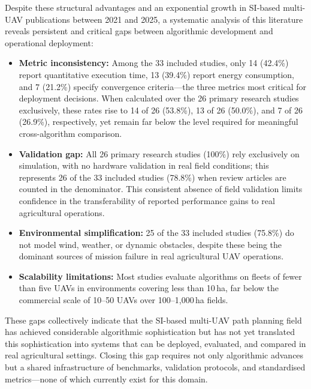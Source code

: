 \documentclass[review,3p,times]{elsarticle}
\begin{document}
Despite these structural advantages and an exponential growth in SI-based multi-UAV publications between 2021 and 2025, a systematic analysis of this literature reveals persistent and critical gaps between algorithmic development and operational deployment:

\begin{itemize}
  \item \textbf{Metric inconsistency:} Among the 33 included studies, only 14 (42.4\%)
  report quantitative execution time, 13 (39.4\%) report energy consumption, and
  7 (21.2\%) specify convergence criteria---the three metrics most critical for
  deployment decisions. When calculated over the 26 primary research studies
  exclusively, these rates rise to 14 of 26 (53.8\%), 13 of 26 (50.0\%), and
  7 of 26 (26.9\%), respectively, yet remain far below the level required for
  meaningful cross-algorithm comparison.

  \item \textbf{Validation gap:} All 26 primary research studies (100\%) rely
  exclusively on simulation, with no hardware validation in real field conditions;
  this represents 26 of the 33 included studies (78.8\%) when review articles are
  counted in the denominator. This consistent absence of field validation limits
  confidence in the transferability of reported performance gains to real agricultural
  operations.

  \item \textbf{Environmental simplification:} 25 of the 33 included studies (75.8\%)
  do not model wind, weather, or dynamic obstacles, despite these being the dominant
  sources of mission failure in real agricultural UAV operations.

  \item \textbf{Scalability limitations:} Most studies evaluate algorithms on fleets
  of fewer than five UAVs in environments covering less than 10\,ha, far below the
  commercial scale of 10--50 UAVs over 100--1,000\,ha fields.
\end{itemize}

These gaps collectively indicate that the SI-based multi-UAV path planning field has achieved considerable algorithmic sophistication but has not yet translated this sophistication into systems that can be deployed, evaluated, and compared in real agricultural settings. Closing this gap requires not only algorithmic advances but a shared infrastructure of benchmarks, validation protocols, and standardised metrics---none of which currently exist for this domain.
\end{document}
